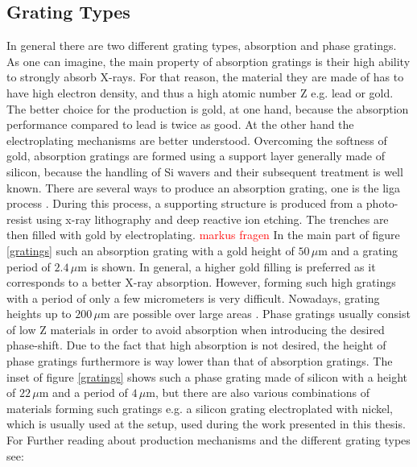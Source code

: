 \subsection{Grating Types} \label{subsec: gt}
In general there are two different grating types, absorption and phase gratings. As one can imagine, the main property of absorption gratings is their high ability to strongly absorb X-rays. For that reason, the material they are made of has to have high electron density, and thus a high atomic number Z e.g. lead or gold. The better choice for the production is gold, at one hand, because the absorption performance compared to lead is twice as good. At the other hand the electroplating mechanisms are better understood. Overcoming the softness of gold, absorption gratings are formed using a support layer generally made of silicon, because the handling of Si wavers and their subsequent treatment is well known. There are several ways to produce an absorption grating, one is the \gls{liga} process \citep{hier noch markus fragen}. During this process, a supporting structure is produced from a photo-resist using x-ray lithography and deep reactive ion etching. The trenches are then filled with gold by electroplating. \textcolor{red}{markus fragen} 
In the main part of figure \ref{gratings} such an absorption grating with a gold height of $50\, \mu$m and a grating period of $2.4\, \mu$m is shown. In general, a higher gold filling is preferred as it corresponds to a better X-ray absorption. However, forming such high gratings with a period of only a few micrometers is very difficult. Nowadays, grating heights up to $ 200\, \mu$m are possible over large areas \citep{Qin2015}. Phase gratings usually consist of low Z materials in order to avoid absorption when introducing the desired phase-shift. Due to the fact that high absorption is not desired, the height of phase gratings furthermore is way lower than that of absorption gratings. The inset of figure \ref{gratings} shows such a phase grating made of silicon with a height of $22\, \mu$m and a period of $4\, \mu$m, but there are also various combinations of materials forming such gratings e.g. a silicon grating electroplated with nickel, which is usually used at the setup, used during the work presented in this thesis. For Further reading about production mechanisms and the different grating types see: \citep{Lei2014.Mohraspect}     
